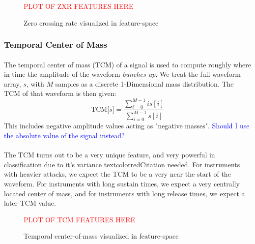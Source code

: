 \documentclass[12pt,letterpaper]{article}
\begin{document}
\begin{figure}[H]
\begin{center}
\textcolor{red}{PLOT OF ZXR FEATURES HERE}
\end{center}
\caption{Zero crossing rate visualized in feature-space}
\label{fig-FeatureZXR}
\end{figure}


\subsubsection{Temporal Center of Mass}

\paragraph*{}The temporal center of mass (TCM) of a signal is used to compute roughly where in time the amplitude of the waveform \textit{bunches up}. We treat the full waveform array, $s$, with $M$ samples as a discrete 1-Dimensional mass distribution. The TCM of that waveform is then given:
\begin{equation}
\label{eqn-FeatureTCM}
\text{TCM}\big[ s \big] = \frac{\sum_{i=0}^{M-1}i s[i]}{\sum_{i=0}^{M-1}s[i]}
\end{equation}
This includes negative amplitude values acting as "negative masses". \textcolor{blue}{Should I use the absolute value of the signal instead?}

\paragraph*{}The TCM turns out to be a very unique feature, and very powerful in classification due to it's variance textcolor{red}{Citation needed}. For instruments with heavier attacks, we expect the TCM to be a very near the start of the waveform. For instruments with long sustain times, we expect a very centrally located center of mass, and for instruments with long release times, we expect a later TCM value.

\begin{figure}[H]
\begin{center}
\textcolor{red}{PLOT OF TCM FEATURES HERE}
\end{center}
\caption{Temporal center-of-mass visualized in feature-space}
\label{fig-FeatureTCM}
\end{figure}

\end{document}
